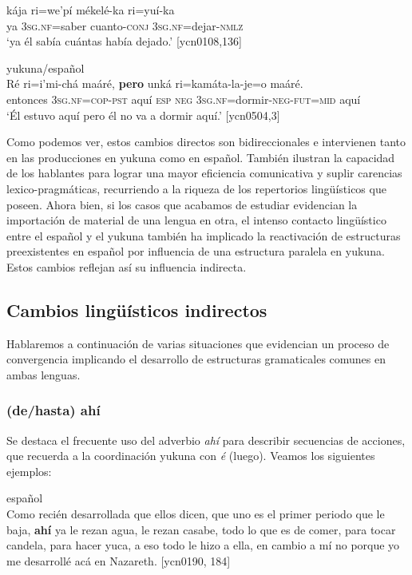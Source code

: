 \documentclass[output=paper]{langscibook}
\begin{document}
\ea
\gll kája ri=we’pí   mékelé-ka   ri=yuí-ka\\
     ya \textsc{3sg.nf}=saber cuanto-\textsc{conj} \textsc{3sg.nf=}dejar-\textsc{nmlz}\\
\glt `ya él sabía cuántas había dejado.' [ycn0108,136]
\z

\ea\label{ex:lemus:11}
{yukuna/español}\\
\gll Ré ri=i’mi-chá   maáré, \textbf{pero}   unká   ri=kamáta-la-je=o maáré.\\
entonces \textsc{3sg.nf=cop-pst} aquí \textsc{esp} \textsc{neg} \textsc{3sg.nf=}dormir-\textsc{neg-fut=mid} aquí\\
\glt `Él estuvo aquí pero él no va a dormir aquí.' [ycn0504,3]
\z

Como podemos ver, estos cambios directos son bidireccionales e intervienen tanto en las producciones en yukuna como en español. También ilustran la capacidad de los hablantes para lograr una mayor eficiencia comunicativa y suplir carencias lexico-pragmáticas, recurriendo a la riqueza de los repertorios lingüísticos que poseen. Ahora bien, si los casos que acabamos de estudiar evidencian la importación de material de una lengua en otra, el intenso contacto lingüístico entre el español y el yukuna también ha implicado la reactivación de estructuras preexistentes en español por influencia de una estructura paralela en yukuna. Estos cambios reflejan así su influencia indirecta.  



\subsection{Cambios lingüísticos indirectos}



Hablaremos a continuación de varias situaciones que evidencian un proceso de convergencia implicando el desarrollo de estructuras gramaticales comunes en ambas lenguas.


\subsubsection{(de/hasta) ahí}


Se destaca el frecuente uso del adverbio \textit{ahí} para describir secuencias de acciones, que recuerda a la coordinación yukuna con \textit{é} (luego). Veamos los siguientes ejemplos:

\ea\label{ex:lemus:12}
{\label{bkm:Ref484433697}español}\\
Como recién desarrollada que ellos dicen, que uno es el primer periodo que le baja, \textbf{ahí} ya le rezan agua, le rezan casabe, todo lo que es de comer, para tocar candela, para hacer yuca, a eso todo le hizo a ella, en cambio a mí no porque yo me desarrollé acá en Nazareth. {[ycn0190, 184}]\\
\z
\end{document}
